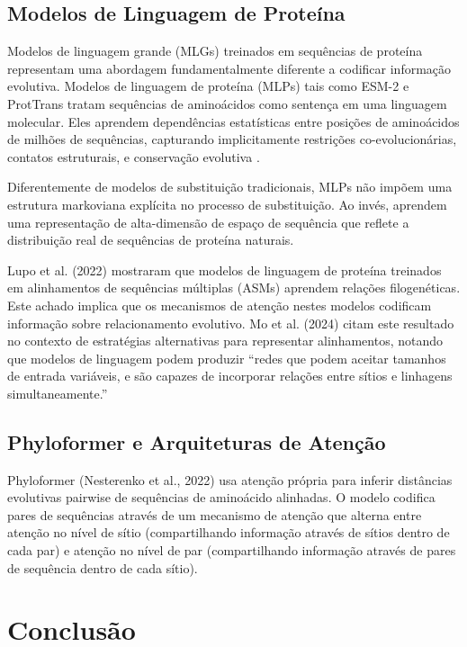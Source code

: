 \subsection{Modelos de Linguagem de Proteína}

Modelos de linguagem grande (MLGs) treinados em sequências de proteína representam uma abordagem fundamentalmente diferente a codificar informação evolutiva. Modelos de linguagem de proteína (MLPs) tais como ESM-2 e ProtTrans tratam sequências de aminoácidos como sentença em uma linguagem molecular. Eles aprendem dependências estatísticas entre posições de aminoácidos de milhões de sequências, capturando implicitamente restrições co-evolucionárias, contatos estruturais, e conservação evolutiva \parencite{valentini2023}.

Diferentemente de modelos de substituição tradicionais, MLPs não impõem uma estrutura markoviana explícita no processo de substituição. Ao invés, aprendem uma representação de alta-dimensão de espaço de sequência que reflete a distribuição real de sequências de proteína naturais.

Lupo et al. (2022) mostraram que modelos de linguagem de proteína treinados em alinhamentos de sequências múltiplas (ASMs) aprendem relações filogenéticas. Este achado implica que os mecanismos de atenção nestes modelos codificam informação sobre relacionamento evolutivo. Mo et al. (2024) citam este resultado no contexto de estratégias alternativas para representar alinhamentos, notando que modelos de linguagem podem produzir ``redes que podem aceitar tamanhos de entrada variáveis, e são capazes de incorporar relações entre sítios e linhagens simultaneamente.''

\subsection{Phyloformer e Arquiteturas de Atenção}

Phyloformer (Nesterenko et al., 2022) usa atenção própria para inferir distâncias evolutivas pairwise de sequências de aminoácido alinhadas. O modelo codifica pares de sequências através de um mecanismo de atenção que alterna entre atenção no nível de sítio (compartilhando informação através de sítios dentro de cada par) e atenção no nível de par (compartilhando informação através de pares de sequência dentro de cada sítio).

\section{Conclusão}


